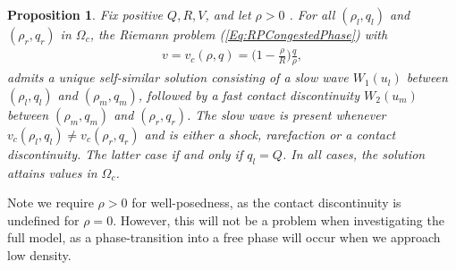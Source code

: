 \documentclass[10pt]{article}
\newtheorem{proposition}{Proposition}[theorem]
\numberwithin{equation}{section}
\begin{document}
\begin{proposition}
Fix positive $Q, R, V$, and let $\rho > 0$ . For all $(\rho_l, q_l)$ and $(\rho_r, q_r)$ in $\Omega_c$, the Riemann problem (\ref{Eq:RPCongestedPhase}) with \begin{align*}
    v = v_c(\rho,q) = \big(1 - \frac{\rho}{R}\big)\frac{q}{\rho},
\end{align*} admits a unique self-similar solution consisting of a slow wave $W_1(u_l)$ between  $(\rho_l, q_l)$ and  $(\rho_m, q_m)$, followed by a fast contact discontinuity  $W_2(u_m)$ between  $(\rho_m, q_m)$ and  $(\rho_r, q_r)$. The slow wave is present whenever $v_c(\rho_l, q_l) \neq v_c(\rho_r, q_r)$ and is either a shock, rarefaction or a contact discontinuity. The latter case if and only if $q_l = Q$. In all cases, the solution attains values in $\Omega_c$.
\end{proposition}
Note we require $\rho > 0$ for well-posedness, as the contact discontinuity is undefined for $\rho = 0$. However, this will not be a problem when investigating the full model, as a phase-transition into a free phase will occur when we approach low density. 

\begin{figure} \centering
    
\end{figure}
\end{document}

